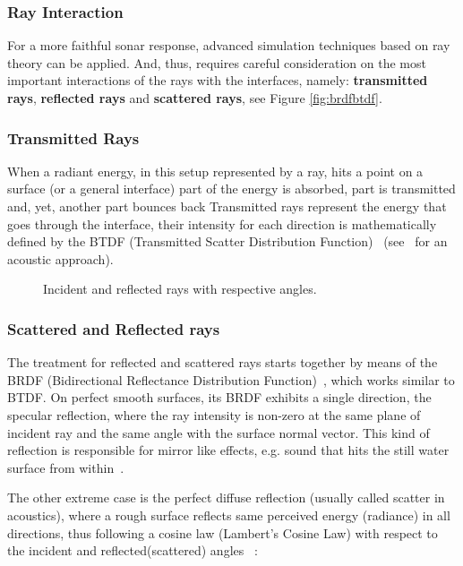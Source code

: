 \subsubsection{Ray Interaction}

For a more faithful sonar response, advanced simulation techniques based on ray
theory can be applied. And, thus, requires careful consideration on the most
important interactions of the rays with the interfaces, namely:
\textbf{transmitted rays}, \textbf{reflected rays}  and \textbf{scattered rays},
see Figure \ref{fig:brdfbtdf}.

\subsubsection{Transmitted Rays}
When a radiant energy, in this setup represented by a ray, hits a point on a
surface (or a general interface) part of the energy is absorbed, part is
transmitted and, yet, another part bounces back Transmitted rays represent the
energy that goes through the interface, their intensity for each direction is
mathematically defined by the BTDF (Transmitted Scatter Distribution
Function)~\cite{bartell1981theory} (see~\citet{rober2007ray} for an acoustic
approach).


\begin{figure}[h]
	\centering
	
	\caption{Incident and reflected rays with respective angles.}
	\label{fig:ray_reflect}
\end{figure}


\subsubsection{Scattered and Reflected rays}
\label{sss:rays}
The treatment for reflected and scattered rays starts together by means of the
BRDF (Bidirectional Reflectance Distribution
Function)~\cite{blake1995remote,miller2015real,durany2015analytical}, which works
similar to BTDF. On perfect smooth surfaces, its BRDF exhibits a single
direction, the specular reflection, where the ray intensity is non-zero at the
same plane of incident ray and the same angle with the surface normal vector.
This kind of reflection is responsible for mirror like effects, e.g. sound that hits
the still water surface from within~\cite{LURTON,Etter2013}.

The other extreme case is the perfect diffuse reflection (usually called scatter
in acoustics), where a rough surface reflects same perceived energy (radiance)
in all directions, thus following a cosine law (Lambert's Cosine Law) with
respect to the incident and reflected(scattered) angles
~\cite{united1977geometrical,cox2004acoustic}:

